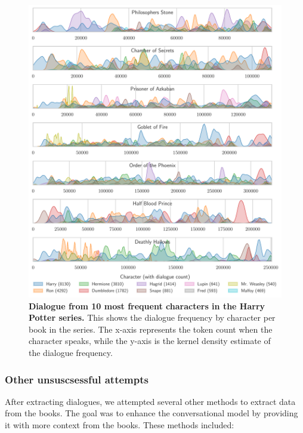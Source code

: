 \documentclass[fleqn,moreauthors,10pt]{ds_report}
\begin{document}
\begin{figure}[H]
	\centering
	\includegraphics[width=\linewidth]{hp_dialogue.pdf}
	\caption{\textbf{Dialogue from 10 most frequent characters in the Harry Potter series.} This shows the dialogue frequency by character per book in the series. The x-axis represents the token count when the character speaks, while the y-axis is the kernel density estimate of the dialogue frequency.}
	\label{fig:hp_dialogue}
\end{figure}




\subsubsection*{Other unsuscsessful attempts}

After extracting dialogues, we attempted several other methods to extract data from the books. The goal was to enhance the conversational model by providing it with more context from the books. These methods included:
\end{document}
